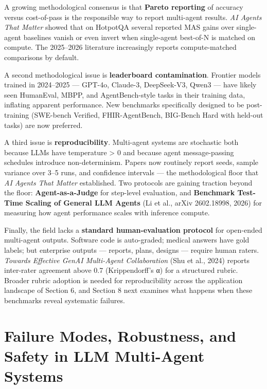 A growing methodological consensus is that \textbf{Pareto reporting} of accuracy versus cost-of-pass is the responsible way to report multi-agent results. \emph{AI Agents That Matter} showed that on HotpotQA several reported MAS gains over single-agent baselines vanish or even invert when single-agent best-of-N is matched on compute. The 2025--2026 literature increasingly reports compute-matched comparisons by default.

A second methodological issue is \textbf{leaderboard contamination}. Frontier models trained in 2024--2025 --- GPT-4o, Claude-3, DeepSeek-V3, Qwen3 --- have likely seen HumanEval, MBPP, and AgentBench-style tasks in their training data, inflating apparent performance. New benchmarks specifically designed to be post-training (SWE-bench Verified, FHIR-AgentBench, BIG-Bench Hard with held-out tasks) are now preferred.

A third issue is \textbf{reproducibility}. Multi-agent systems are stochastic both because LLMs have temperature \textgreater{} 0 and because agent message-passing schedules introduce non-determinism. Papers now routinely report seeds, sample variance over 3--5 runs, and confidence intervals --- the methodological floor that \emph{AI Agents That Matter} established. Two protocols are gaining traction beyond the floor: \textbf{Agent-as-a-Judge} for step-level evaluation, and \textbf{Benchmark Test-Time Scaling of General LLM Agents} (Li et al., arXiv 2602.18998, 2026) for measuring how agent performance scales with inference compute.

Finally, the field lacks a \textbf{standard human-evaluation protocol} for open-ended multi-agent outputs. Software code is auto-graded; medical answers have gold labels; but enterprise outputs --- reports, plans, designs --- require human raters. \emph{Towards Effective GenAI Multi-Agent Collaboration} (Shu et al., 2024) reports inter-rater agreement above 0.7 (Krippendorff's α) for a structured rubric. Broader rubric adoption is needed for reproducibility across the application landscape of Section 6, and Section 8 next examines what happens when these benchmarks reveal systematic failures.

\section{Failure Modes, Robustness, and Safety in LLM Multi-Agent Systems}\label{failure-modes-robustness-and-safety-in-llm-multi-agent-systems}

